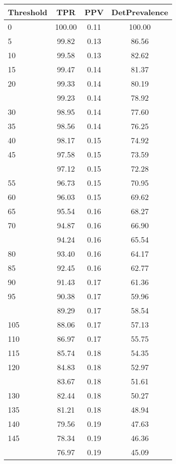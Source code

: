 \begin{table}[ht]
\centering
\begin{tabular}{lccc}
  \toprule
Threshold & TPR & PPV & DetPrevalence \\ 
  \midrule
0 & 100.00 & 0.11 & 100.00 \\ 
  5 & 99.82 & 0.13 & 86.56 \\ 
  10 & 99.58 & 0.13 & 82.62 \\ 
  15 & 99.47 & 0.14 & 81.37 \\ 
  20 & 99.33 & 0.14 & 80.19 \\ 
   \addlinespace
25 & 99.23 & 0.14 & 78.92 \\ 
  30 & 98.95 & 0.14 & 77.60 \\ 
  35 & 98.56 & 0.14 & 76.25 \\ 
  40 & 98.17 & 0.15 & 74.92 \\ 
  45 & 97.58 & 0.15 & 73.59 \\ 
   \addlinespace
50 & 97.12 & 0.15 & 72.28 \\ 
  55 & 96.73 & 0.15 & 70.95 \\ 
  60 & 96.03 & 0.15 & 69.62 \\ 
  65 & 95.54 & 0.16 & 68.27 \\ 
  70 & 94.87 & 0.16 & 66.90 \\ 
   \addlinespace
75 & 94.24 & 0.16 & 65.54 \\ 
  80 & 93.40 & 0.16 & 64.17 \\ 
  85 & 92.45 & 0.16 & 62.77 \\ 
  90 & 91.43 & 0.17 & 61.36 \\ 
  95 & 90.38 & 0.17 & 59.96 \\ 
   \addlinespace
100 & 89.29 & 0.17 & 58.54 \\ 
  105 & 88.06 & 0.17 & 57.13 \\ 
  110 & 86.97 & 0.17 & 55.75 \\ 
  115 & 85.74 & 0.18 & 54.35 \\ 
  120 & 84.83 & 0.18 & 52.97 \\ 
   \addlinespace
125 & 83.67 & 0.18 & 51.61 \\ 
  130 & 82.44 & 0.18 & 50.27 \\ 
  135 & 81.21 & 0.18 & 48.94 \\ 
  140 & 79.56 & 0.19 & 47.63 \\ 
  145 & 78.34 & 0.19 & 46.36 \\ 
   \addlinespace
150 & 76.97 & 0.19 & 45.09 \\ 

\end{tabular}
\end{table}
